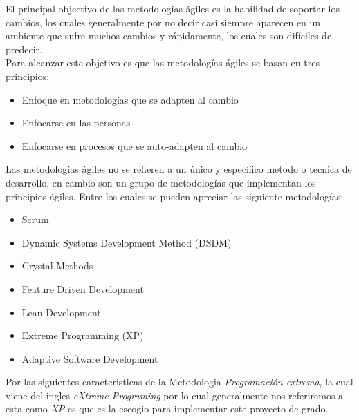 
    El principal objectivo de las metodologías ágiles es la habilidad de soportar los cambios, los cuales generalmente por no decir casi siempre aparecen en un ambiente que sufre muchos cambios y rápidamente, los cuales son difíciles de predecir.\cite{design2005}\\


    Para alcanzar este objetivo es que las metodologías ágiles se basan en tres principios\cite{8}:

\begin{itemize}
  \item Enfoque en metodologías que se adapten al cambio
  \item Enfocarse en las personas
  \item Enfocarse en procesos que se auto-adapten al cambio
\end{itemize}

    Las metodologías ágiles no se refieren a un único y específico metodo o tecnica de desarrollo, en cambio son un grupo de metodologías que implementan los principios ágiles. Entre los cuales se pueden apreciar las siguiente metodologías:\\

    \begin{itemize}
      \item Scrum
      \item Dynamic Systems Development Method (DSDM)
      \item Crystal Methods
      \item Feature Driven Development
      \item Lean Development
      \item Extreme Programming (XP)
      \item Adaptive Software Development
    \end{itemize}


    Por las siguientes caracteristicas de la Metodologia \emph{Programaci\'on extrema}, la cual viene del ingles \emph{eXtreme Programing} por lo cual generalmente nos referiremos a esta como \emph{XP} es que es la escogio para implementar este proyecto de grado.


